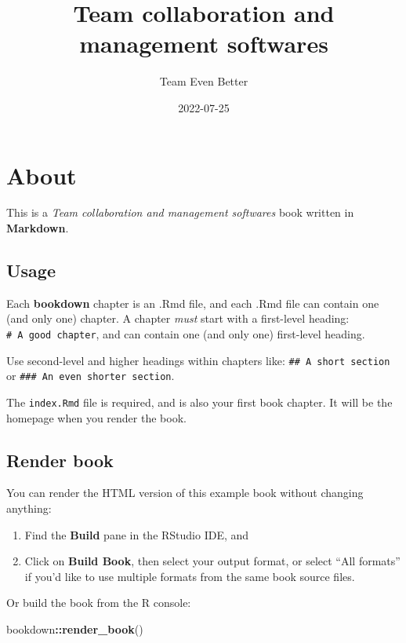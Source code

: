 \documentclass[
]{book}
\title{Team collaboration and management softwares}
\author{Team Even Better}
\date{2022-07-25}
\newenvironment{Shaded}{\begin{snugshade}}{\end{snugshade}}
\newcommand{\KeywordTok}[1]{\textcolor[rgb]{0.13,0.29,0.53}{\textbf{#1}}}
\newcommand{\NormalTok}[1]{#1}
\newcommand{\OperatorTok}[1]{\textcolor[rgb]{0.81,0.36,0.00}{\textbf{#1}}}
\begin{document}
\maketitle

{
\setcounter{tocdepth}{1}
\tableofcontents
}
\hypertarget{about}{%
\chapter{About}\label{about}}

This is a \emph{Team collaboration and management softwares} book written in \textbf{Markdown}.

\hypertarget{usage}{%
\section{Usage}\label{usage}}

Each \textbf{bookdown} chapter is an .Rmd file, and each .Rmd file can contain one (and only one) chapter. A chapter \emph{must} start with a first-level heading: \texttt{\#\ A\ good\ chapter}, and can contain one (and only one) first-level heading.

Use second-level and higher headings within chapters like: \texttt{\#\#\ A\ short\ section} or \texttt{\#\#\#\ An\ even\ shorter\ section}.

The \texttt{index.Rmd} file is required, and is also your first book chapter. It will be the homepage when you render the book.

\hypertarget{render-book}{%
\section{Render book}\label{render-book}}

You can render the HTML version of this example book without changing anything:

\begin{enumerate}
\def\labelenumi{\arabic{enumi}.}
\item
  Find the \textbf{Build} pane in the RStudio IDE, and
\item
  Click on \textbf{Build Book}, then select your output format, or select ``All formats'' if you'd like to use multiple formats from the same book source files.
\end{enumerate}

Or build the book from the R console:

\begin{Shaded}
\begin{Highlighting}[]
\NormalTok{bookdown}\OperatorTok{::}\KeywordTok{render_book}\NormalTok{()}
\end{Highlighting}
\end{Shaded}
\end{document}
